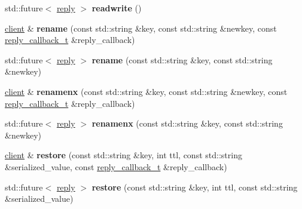 \begin{DoxyCompactItemize}
std\+::future$<$ \hyperlink{classcpp__redis_1_1reply}{reply} $>$ {\bfseries readwrite} ()
\item 
\mbox{\label{classcpp__redis_1_1client_abbc2bb4b988d5e3e539d65d3eb9f511f}} 
\hyperlink{classcpp__redis_1_1client}{client} \& {\bfseries rename} (const std\+::string \&key, const std\+::string \&newkey, const \hyperlink{classcpp__redis_1_1client_a061a1140d36d2eaeda82b09a0bb3f9f2}{reply\+\_\+callback\+\_\+t} \&reply\+\_\+callback)
\item 
\mbox{\label{classcpp__redis_1_1client_a6a4ab4ac68aa92560569db6683bb591c}} 
std\+::future$<$ \hyperlink{classcpp__redis_1_1reply}{reply} $>$ {\bfseries rename} (const std\+::string \&key, const std\+::string \&newkey)
\item 
\mbox{\label{classcpp__redis_1_1client_a80b0abd5548ae3bfe22ed008767689c0}} 
\hyperlink{classcpp__redis_1_1client}{client} \& {\bfseries renamenx} (const std\+::string \&key, const std\+::string \&newkey, const \hyperlink{classcpp__redis_1_1client_a061a1140d36d2eaeda82b09a0bb3f9f2}{reply\+\_\+callback\+\_\+t} \&reply\+\_\+callback)
\item 
\mbox{\label{classcpp__redis_1_1client_a1b5110b73c9561e5b235317fa03ee4bb}} 
std\+::future$<$ \hyperlink{classcpp__redis_1_1reply}{reply} $>$ {\bfseries renamenx} (const std\+::string \&key, const std\+::string \&newkey)
\item 
\mbox{\label{classcpp__redis_1_1client_a3598f781ae048b03edcdb07e8d2c0f41}} 
\hyperlink{classcpp__redis_1_1client}{client} \& {\bfseries restore} (const std\+::string \&key, int ttl, const std\+::string \&serialized\+\_\+value, const \hyperlink{classcpp__redis_1_1client_a061a1140d36d2eaeda82b09a0bb3f9f2}{reply\+\_\+callback\+\_\+t} \&reply\+\_\+callback)
\item 
\mbox{\label{classcpp__redis_1_1client_a5b7a7d7de93268198f27cd21f63ba337}} 
std\+::future$<$ \hyperlink{classcpp__redis_1_1reply}{reply} $>$ {\bfseries restore} (const std\+::string \&key, int ttl, const std\+::string \&serialized\+\_\+value)
\item 
\mbox{\label{classcpp__redis_1_1client_a5ebff3760403ee7d031083f185792780}} 

\end{DoxyCompactItemize}
